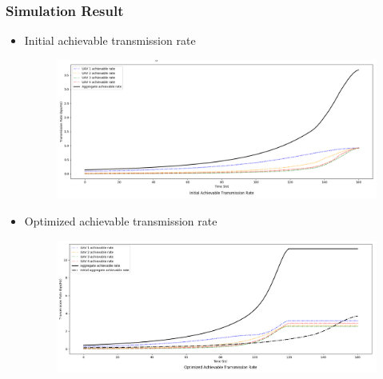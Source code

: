 \documentclass[11.5pt]{beamer}
\begin{document}
\begin{frame}
	\frametitle{Simulation Result}
	\begin{itemize}\itemsep-0.5em
		\item Initial achievable transmission rate
		\begin{figure}
			\includegraphics[width=.7\linewidth]{init_rate.png}
		\end{figure}
		\item Optimized achievable transmission rate
		\begin{figure}
			\includegraphics[width=.7\linewidth]{opt_rate.png}
		\end{figure}
	\end{itemize}
\end{frame}
\end{document}
